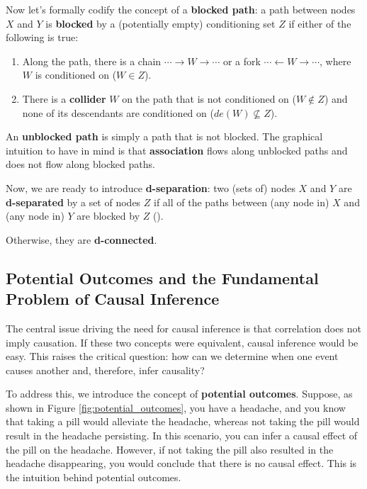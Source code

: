 Now let's formally codify the concept of a \textbf{blocked path}:
a path between nodes \( X \) and \( Y \) is \textbf{blocked} by a
(potentially empty) conditioning set \( Z \) if either of the following
is true:
\begin{enumerate}
    \item Along the path, there is a chain
    \(\cdots \rightarrow W \rightarrow \cdots\) or a fork
    \(\cdots \leftarrow W \rightarrow \cdots\),
    where \( W \) is conditioned on (\( W \in Z \)).
    \item There is a \textbf{collider} \( W \) on the path
    that is not conditioned on (\( W \notin Z \)) and none
    of its descendants are conditioned on (\( de(W) \nsubseteq Z \)).
\end{enumerate}

An \textbf{unblocked path} is simply a path that is not blocked.
The graphical intuition to have in mind is that \textbf{association} flows along
unblocked paths and does not flow along blocked paths.

Now, we are ready to introduce
\textbf{d-separation}: two (sets of) nodes \( X \) and \( Y \) are
\textbf{d-separated} by a set of nodes \( Z \) if all of the paths
between (any node in) \( X \) and (any node in) \( Y \) are blocked by \( Z \)
(\cite{pearl1988}).

Otherwise, they are \textbf{d-connected}.


\subsection{Potential Outcomes and the Fundamental Problem of Causal Inference}
\label{sec:potential_outcomes}

The central issue driving the need for causal inference is that
correlation does not imply causation. If these two concepts were equivalent,
causal inference would be easy.
This raises the critical question: how can we determine when one
event causes another and, therefore, infer causality?

To address this, we introduce the concept of \textbf{potential outcomes}.
Suppose, as shown in Figure \ref{fig:potential_outcomes},
you have a headache, and you know that taking a pill would alleviate
the headache, whereas not taking the pill would result in the
headache persisting. In this scenario, you can infer a causal effect
of the pill on the headache. However, if not taking the pill
also resulted in the headache disappearing, you would conclude
that there is no causal effect.
This is the intuition behind potential outcomes.

